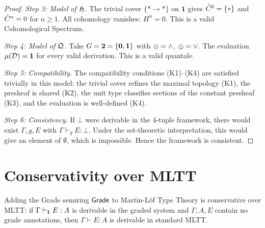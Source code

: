 \begin{proof}
\emph{Step 3: Model of $\mathfrak{H}$.}
The trivial cover $\{* \to *\}$ on $\mathbf{1}$ gives
$\check{C}^0 = \{*\}$ and $\check{C}^n = 0$ for $n \geq 1$.  All cohomology
vanishes: $H^n = 0$.  This is a valid Cohomological Spectrum.

\emph{Step 4: Model of $\mathfrak{Q}$.}
Take $G = \mathbf{2} = \{\mathbf{0}, \mathbf{1}\}$ with $\otimes = \land$,
$\oplus = \lor$.  The evaluation $\mu(\mathcal{D}) = \mathbf{1}$ for every
valid derivation.  This is a valid quantale.

\emph{Step 5: Compatibility.}
The compatibility conditions (K1)--(K4) are satisfied trivially in
this model: the trivial cover refines the maximal topology (K1),
the presheaf is shared (K2), the unit type classifies sections
of the constant presheaf (K3), and the evaluation is well-defined
(K4).

\emph{Step 6: Consistency.}
If $\bot$ were derivable in the 4-tuple framework, there would exist
$\Gamma, g, E$ with $\Gamma \vdash_g E : \bot$.  Under the
set-theoretic interpretation, this would give an element of $\emptyset$,
which is impossible.  Hence the framework is consistent.
\end{proof}

\section{Conservativity over MLTT}
\label{sec:conservativity}

\begin{theorem}
\label{thm:conservative}
Adding the Grade semiring $\mathsf{Grade}$ to Martin-L\"of Type Theory is
conservative over MLTT: if $\Gamma \vdash_{\mathbf{1}} E : A$ is
derivable in the graded system and $\Gamma, A, E$ contain no grade
annotations, then $\Gamma \vdash E : A$ is derivable in standard
MLTT.
\end{theorem}

